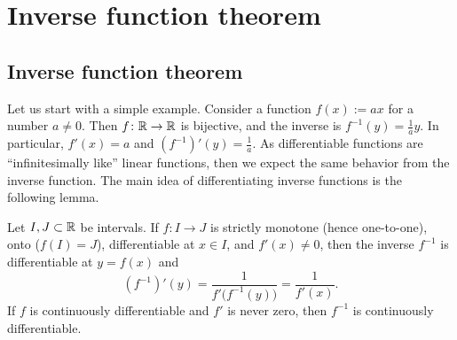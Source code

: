 
\sectionnewpage
\section{Inverse function theorem}
\label{sec:ift}


\subsection{Inverse function theorem}

Let us start with a simple example.  Consider a function $f(x) := a x$ for a
number $a \not= 0$.  Then $f \colon {\mathbb{R}} \to {\mathbb{R}}$ is bijective, and the inverse
is $f^{-1}(y) = \frac{1}{a} y$.  In particular, $f'(x) = a$ and 
$(f^{-1})'(y) = \frac{1}{a}$.  As differentiable functions are
``infinitesimally like'' linear functions, then we expect the same
behavior from the inverse function.
The main idea of differentiating inverse functions is the following lemma.

\begin{lemma} \label{lemma:ift}
Let $I,J \subset {\mathbb{R}}$ be intervals.
If $f \colon I \to J$ is strictly monotone (hence one-to-one),
onto ($f(I) = J$),
differentiable at $x \in I$, and $f'(x) \not= 0$,
then the inverse 
$f^{-1}$ is differentiable at $y = f(x)$ and
\begin{equation*}
(f^{-1})'(y) = \frac{1}{f'\bigl( f^{-1}(y) \bigr)} = \frac{1}{f'(x)} .
\end{equation*}
If $f$ is continuously differentiable and $f'$ is never zero, then $f^{-1}$
is continuously differentiable.
\end{lemma}

